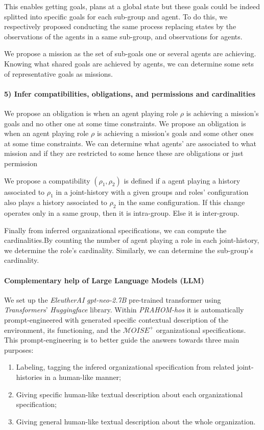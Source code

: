 \documentclass{ecai}
\begin{document}
This enables getting goals, plans at a global state but these goals could be indeed splitted into specific goals for each sub-group and agent. To do this, we respectively proposed conducting the same process replacing states by the observations of the agents in a same sub-group, and observations for agents.

We propose a mission as the set of sub-goals one or several agents are achieving.
Knowing what shared goals are achieved by agents, we can determine some sets of representative goals as missions.

\paragraph{5) Infer compatibilities, obligations, and permissions and cardinalities}

We propose an obligation is when an agent playing role $\rho$ is achieving a mission's goals and no other one at some time constraints.
We propose an obligation is when an agent playing role $\rho$ is achieving a mission's goals and some other ones at some time constraints.
We can determine what agents' are associated to what mission and if they are restricted to some hence these are obligations or just permission

We propose a compatibility $(\rho_1,\rho_2)$ is defined if a agent playing a history associated to $\rho_1$ in a joint-history with a given groups and roles' configuration also plays a history associated to $\rho_2$ in the same configuration. If this change operates only in a same group, then it is intra-group. Else it is inter-group.

Finally from inferred organizational specifications, we can compute the cardinalities.By counting the number of agent playing a role in each joint-history, we determine the role's cardinality. Similarly, we can determine the sub-group's cardinality.

\paragraph{Complementary help of Large Language Models (LLM)}

We set up the \emph{EleutherAI} \emph{gpt-neo-2.7B} pre-trained transformer using \emph{Transformers}' \emph{Huggingface} library. Within \emph{PRAHOM-hos} it is automatically prompt-engineered with generated specific contextual description of the environment, its functioning, and the $\mathcal{M}OISE^+$ organizational specifications. This prompt-engineering is to better guide the answers towards three main purposes:
\begin{enumerate}
    \item Labeling, tagging the infered organizational specification from related joint-histories in a human-like manner;
    \item Giving specific human-like textual description about each organizational specification;
    \item Giving general human-like textual description about the whole organization.
\end{enumerate}
\end{document}

